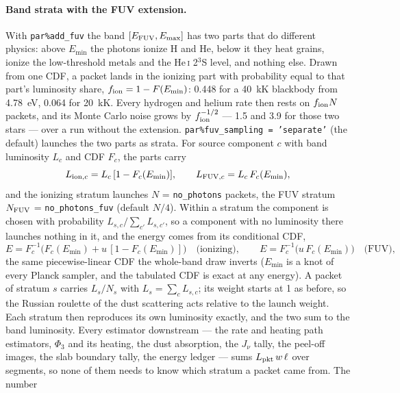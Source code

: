 \documentclass[english,a4paper]{my_memo}
\newcommand{\code}[1]{\texttt{#1}}
\begin{document}
\paragraph{Band strata with the FUV extension.}\label{sec:band-strata}
With \code{par\%add\_fuv} the band $[E_{\rm FUV}, E_{\max}]$ has two parts
that do different physics: above $E_{\min}$ the photons ionize H and He,
below it they heat grains, ionize the low-threshold metals and the
He\,\textsc{i} 2$^3$S level, and nothing else.  Drawn from one CDF, a
packet lands in the ionizing part with probability equal to that part's
luminosity share, $f_{\rm ion} = 1 - F(E_{\min})$: 0.448 for a 40~kK
blackbody from 4.78~eV, 0.064 for 20~kK.  Every hydrogen and helium rate
then rests on $f_{\rm ion}N$ packets, and its Monte Carlo noise grows by
$f_{\rm ion}^{-1/2}$ --- 1.5 and 3.9 for those two stars --- over a run
without the extension.  \code{par\%fuv\_sampling = 'separate'} (the default)
launches the two parts as strata.  For source component $c$ with band
luminosity $L_c$ and CDF $F_c$, the parts carry
\begin{equation}
  L_{{\rm ion},c} = L_c\,[1 - F_c(E_{\min})], \qquad
  L_{{\rm FUV},c} = L_c\,F_c(E_{\min}),
\end{equation}
and the ionizing stratum launches $N$ = \code{no\_photons} packets, the FUV
stratum $N_{\rm FUV}$ = \code{no\_photons\_fuv} (default $N/4$).  Within a
stratum the component is chosen with probability
$L_{s,c}/\sum_{c'}L_{s,c'}$, so a component with no luminosity there
launches nothing in it, and the energy comes from its conditional CDF,
\begin{equation}
  E = F_c^{-1}\!\big(F_c(E_{\min}) + u\,[1 - F_c(E_{\min})]\big)
  \quad\text{(ionizing)},\qquad
  E = F_c^{-1}\!\big(u\,F_c(E_{\min})\big)
  \quad\text{(FUV)},
\end{equation}
the same piecewise-linear CDF the whole-band draw inverts ($E_{\min}$ is a
knot of every Planck sampler, and the tabulated CDF is exact at any
energy).  A packet of stratum $s$ carries $L_s/N_s$ with
$L_s = \sum_c L_{s,c}$; its weight starts at 1 as before, so the Russian
roulette of the dust scattering acts relative to the launch weight.  Each
stratum then reproduces its own luminosity exactly, and the two sum to the
band luminosity.  Every estimator downstream --- the rate and heating path
estimators, $\Phi_3$ and its heating, the dust absorption, the $J_\nu$ tally, the peel-off images, the slab boundary
tally, the energy ledger --- sums $L_{\rm pkt}\,w\,\ell$ over segments, so
none of them needs to know which stratum a packet came from.  The number
\end{document}
